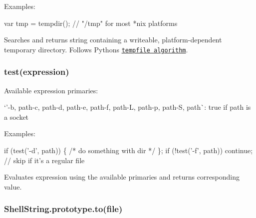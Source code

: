 Examples\+:


\begin{DoxyCode}
var tmp = tempdir(); // "/tmp" for most *nix platforms
\end{DoxyCode}


Searches and returns string containing a writeable, platform-\/dependent temporary directory. Follows Python\textquotesingle{}s \href{http://docs.python.org/library/tempfile.html#tempfile.tempdir}{\tt tempfile algorithm}.

\subsubsection*{test(expression)}

Available expression primaries\+:


\begin{DoxyItemize}
\item `'-\/b\textquotesingle{}, \textquotesingle{}path\textquotesingle{}-\/c\textquotesingle{}, \textquotesingle{}path\textquotesingle{}-\/d\textquotesingle{}, \textquotesingle{}path\textquotesingle{}-\/e\textquotesingle{}, \textquotesingle{}path\textquotesingle{}-\/f\textquotesingle{}, \textquotesingle{}path\textquotesingle{}-\/L\textquotesingle{}, \textquotesingle{}path\textquotesingle{}-\/p\textquotesingle{}, \textquotesingle{}path\textquotesingle{}-\/S\textquotesingle{}, \textquotesingle{}path\textquotesingle{}\`{}\+: true if path is a socket
\end{DoxyItemize}

Examples\+:


\begin{DoxyCode}
if (test('-d', path)) \{ /* do something with dir */ \};
if (!test('-f', path)) continue; // skip if it's a regular file
\end{DoxyCode}


Evaluates expression using the available primaries and returns corresponding value.

\subsubsection*{Shell\+String.\+prototype.\+to(file)}

